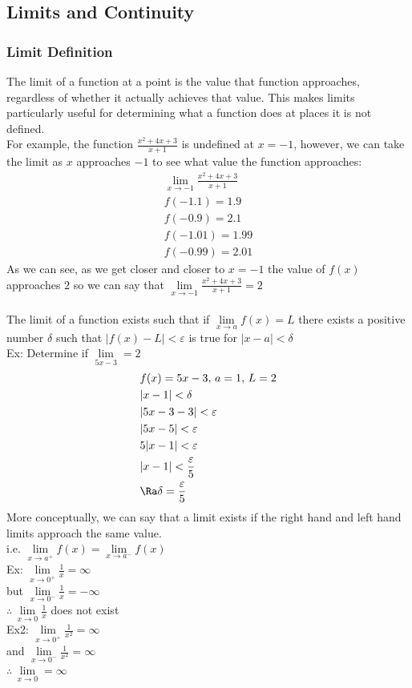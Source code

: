 \subsection{Limits and Continuity}

\subsubsection{Limit Definition}
The limit of a function at a point is the value that function approaches, regardless of whether it actually achieves that value. This makes limits particularly useful for determining what a function does at places it is not defined.\\
For example, the function $\frac{x^2+4x+3}{x+1}$ is undefined at $x=-1$, however, we can take the limit as $x$ approaches $-1$ to see what value the function approaches:
\begin{align*}
    \lim \limits_{x\to -1}\frac{x^2+4x+3}{x+1}\\
    f(-1.1)= 1.9\\
    f(-0.9)= 2.1\\
    f(-1.01)= 1.99\\
    f(-0.99)= 2.01
\end{align*}
As we can see, as we get closer and closer to $x=-1$ the value of $f(x)$ approaches $2$ so we can say that $\lim \limits_{x\to -1}\frac{x^2+4x+3}{x+1}=2$\\
\\
The limit of a function exists such that if $\lim\limits_{x\to a}f(x)=L$ there exists a positive number $\delta$ such that $|f(x)-L|<\varepsilon$ is true for $|x-a|<\delta$\\
Ex: Determine if $\lim\limits_{5x-3}=2$
\begin{align*}
    &f(x)=5x-3,\,a=1,\,L=2\\
    &|x-1|<\delta\\
    &|5x-3-3|<\varepsilon\\
    &|5x-5|<\varepsilon\\
    &5|x-1|<\varepsilon\\
    &|x-1|<\frac{\varepsilon}{5}\\
    &\Ra\delta=\frac{\varepsilon}{5}
\end{align*}
More conceptually, we can say that a limit exists if the right hand and left hand limits approach the same value.\\
i.e. $\lim\limits_{x\to a^+}f(x)=\lim\limits_{x\to a^-}f(x)$\\
Ex: $\lim\limits_{x\to 0^+}\frac{1}{x}=\infty$\\
but $\lim\limits_{x\to 0^-}\frac{1}{x}=-\infty$\\
$\therefore\,\lim\limits_{x\to 0}\frac{1}{x}$ does not exist\\
Ex2: $\lim\limits_{x\to 0^+}\frac{1}{x^2}=\infty$\\
and $\lim\limits_{x\to 0^-}\frac{1}{x^2}=\infty$\\
$\therefore\,\lim\limits_{x\to 0}=\infty$

